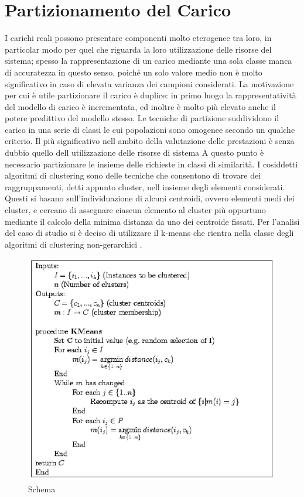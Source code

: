\section{Partizionamento del Carico}
I carichi reali possono presentare componenti molto eterogenee tra loro, in particolar modo per quel 
che riguarda la loro utilizzazione delle risorse del sistema; spesso la rappresentazione di un carico 
mediante una sola classe manca di accuratezza in questo senso, poiché un solo valore medio non è 
molto significativo in caso di elevata varianza dei campioni considerati. 
La motivazione per cui è utile partizionare il carico è duplice: in primo luogo la rappresentatività 
del modello di carico è incrementata, ed inoltre è molto più elevato anche il potere predittivo del 
modello stesso. Le tecniche di partizione suddividono il carico in una serie di classi le cui 
popolazioni sono omogenee secondo un qualche criterio. Il più significativo nell ambito della 
valutazione delle prestazioni è senza dubbio quello dell utilizzazione delle risorse di sistema 
A questo punto è necessario partizionare le insieme delle richieste in classi di similarità. I cosiddetti 
algoritmi di clustering sono delle tecniche che consentono di trovare dei raggruppamenti, detti 
appunto cluster, nell insieme degli elementi considerati. Questi si basano sull'individuazione di 
alcuni centroidi, ovvero elementi medi dei cluster, e cercano di assegnare ciascun elemento al 
cluster più oppurtuno mediante il calcolo della minima distanza da uno dei centroide fissati. 
Per l'analisi del caso di studio si è deciso di utilizzare il k-means che rientra nella classe degli algoritmi di clustering non-gerarchici . 
\begin{figure}[H]
\begin{center}
\includegraphics[scale=0.5]{etc/kmeans.png}
\caption{Schema}
\label{schema3}
\end{center}
\end{figure}

